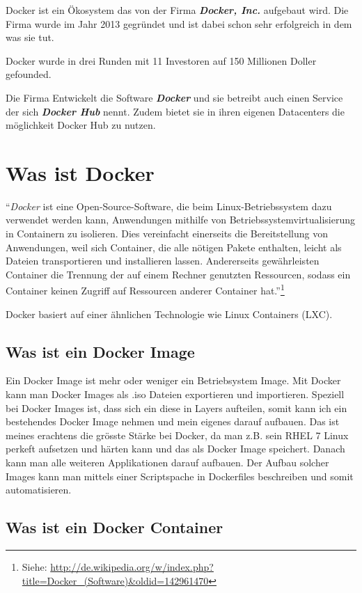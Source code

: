 Docker ist ein Ökosystem das von der Firma \textbf{\textit{Docker, Inc.}} aufgebaut wird.
Die Firma wurde im Jahr 2013 gegründet und ist dabei schon sehr erfolgreich in dem was sie tut.

Docker wurde in drei Runden mit 11 Investoren auf 150 Millionen Doller gefounded.

Die Firma Entwickelt die Software \textbf{\textit{Docker}} und sie betreibt auch einen Service der sich
\textbf{\textit{Docker Hub}} nennt. Zudem bietet sie in ihren eigenen Datacenters die möglichkeit
Docker Hub zu nutzen.

\section{Was ist Docker}

“\textit{Docker} ist eine Open-Source-Software, die beim Linux-Betriebssystem dazu verwendet werden
kann, Anwendungen mithilfe von Betriebssystemvirtualisierung in Containern zu isolieren.
Dies vereinfacht einerseits die Bereitstellung von Anwendungen, weil sich Container, die
alle nötigen Pakete enthalten, leicht als Dateien transportieren und installieren lassen.
Andererseits gewährleisten Container die Trennung der auf einem Rechner genutzten Ressourcen,
sodass ein Container keinen Zugriff auf Ressourcen anderer Container hat.”\footnote{Siehe: \url{http://de.wikipedia.org/w/index.php?title=Docker_(Software)&oldid=142961470}}

Docker basiert auf einer ähnlichen Technologie wie Linux Containers (LXC).

\subsection{Was ist ein Docker Image}

Ein Docker Image ist mehr oder weniger ein Betriebsystem Image. Mit Docker kann man Docker Images
als .iso Dateien exportieren und importieren. Speziell bei Docker Images ist, dass sich ein diese
in Layers aufteilen, somit kann ich ein bestehendes Docker Image nehmen und mein eigenes darauf
aufbauen. Das ist meines erachtens die grösste Stärke bei Docker, da man z.B. sein RHEL 7 Linux
perkeft aufsetzen und härten kann und das als Docker Image speichert. Danach kann man alle
weiteren Applikationen darauf aufbauen. Der Aufbau solcher Images kann man mittels einer
Scriptspache in Dockerfiles beschreiben und somit automatisieren.

\subsection{Was ist ein Docker Container}

